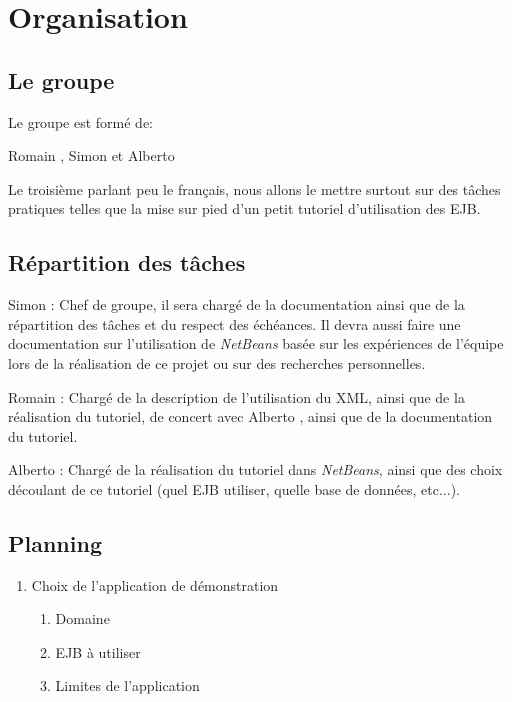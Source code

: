 \documentclass[a4paper, 11pt]{article}
\begin{document}
{\begin{itemize}
	\end{itemize}
	
	\section{Organisation}
	
	\subsection{Le groupe}

	Le groupe est formé de: {Romain , Simon  et Alberto 

	Le troisième parlant peu le français, nous allons le mettre surtout sur des tâches pratiques telles que la mise sur pied d'un petit tutoriel d'utilisation des EJB.

	\subsection{Répartition des tâches}

	Simon : Chef de groupe, il sera chargé de la documentation ainsi que de la répartition des tâches et du respect des échéances. Il devra aussi faire une documentation sur l'utilisation de \emph{NetBeans} basée sur les expériences de l'équipe lors de la réalisation de ce projet ou sur des recherches personnelles.

	Romain : Chargé de la description de l'utilisation du XML, ainsi que de la réalisation du tutoriel, de concert avec Alberto , ainsi que de la documentation du tutoriel.

	Alberto : Chargé de la réalisation du tutoriel dans \emph{NetBeans}, ainsi que des choix découlant de ce tutoriel (quel EJB utiliser, quelle base de données, etc...).

	\subsection{Planning}

	\begin{enumerate}
		\item Choix de l'application de démonstration
		
			\begin{enumerate}
				\item Domaine
				\item EJB à utiliser
				\item Limites de l'application
			\end{enumerate}
				

\end{enumerate}}}
\end{document}
